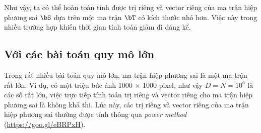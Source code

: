 Như vậy, ta có thể hoàn toàn tính được trị riêng và vector riêng của ma trận
hiệp phương sai $\bS$ dựa trên một ma trận $\bT$ có kích thước nhỏ hơn. Việc
này trong nhiều trường hợp khiến thời gian tính toán giảm đi đáng kể. 
 
 
 
 
 
 
 
 
\subsection{Với các bài toán quy mô lớn}
Trong rất nhiều bài toán quy mô lớn, ma trận hiệp phương sai là một ma trận rất lớn. Ví dụ, có một triệu bức ảnh
1000 $\times$ 1000 pixel, như vậy $D = N = 10^6$ là các số rất lớn, việc trực
tiếp tính toán trị riêng và vector riêng cho ma trận hiệp phương sai là không
khả thi. Lúc này, các trị riêng và vector riêng của ma trận hiệp phương sai thường được tính thông qua \textit{power method}
(\url{https://goo.gl/eBRPxH}). 


